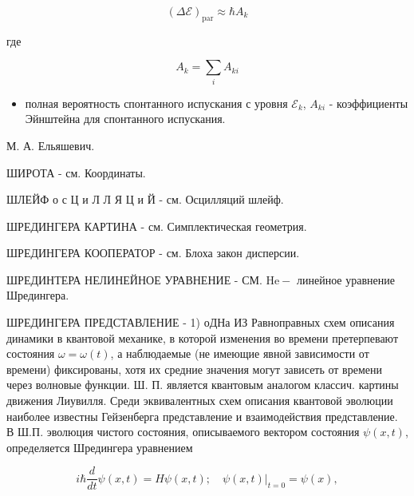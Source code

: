 \documentclass[10pt]{article}
\begin{document}
\[

(\Delta \mathscr{E})_{\mathrm{par}} \approx \hbar A_{k}

\]



где



\[

A_{k}=\sum_{i} A_{k i}

\]



\begin{itemize}

  \item полная вероятность спонтанного испускания с уровня $\mathscr{E}_{k}$, $A_{k i}$ - коэффициенты Эйнштейна для спонтанного испускания.

\end{itemize}



М. А. Ельяшевич.



ШИРОТА - см. Координаты.



ШЛЕЙФ о с Ц и Л Л Я Ц и Й - см. Осцилляций шлейф.



ШРЕДИНГЕРА КАРТИНА - см. Симплектическая геометрия.



ШРЕДИНГЕРА КООПЕРАТОР - см. Блоха закон дисперсии.



ШРЕДИНТЕРА НЕЛИНЕЙНОЕ УРАВНЕНИЕ - СМ. $\mathrm{He}-$ линейное уравнение Шредингера.



ШРЕДИНГЕРА ПРЕДСТАВЛЕНИЕ - 1) оДНа ИЗ Равноправных схем описания динамики в квантовой механике, в которой изменения во времени претерпевают состояния $\omega=\omega(t)$, а наблюдаемые (не имеющие явной зависимости от времени) фиксированы, хотя их средние значения могут зависеть от времени через волновые функции. Ш. П. является квантовым аналогом классич. картины движения Лиувилля. Среди эквивалентных схем описания квантовой эволюции наиболее известны Гейзенберга представление и взаимодействия представление. В Ш.П. эволюция чистого состояния, описываемого вектором состояния $\psi(x, t)$, определяется Шредингера уравнением



\[

i \hbar \frac{d}{d t} \psi(x, t)=H \psi(x, t) ;\left.\quad \psi(x, t)\right|_{t=0}=\psi(x),

\]
\end{document}
